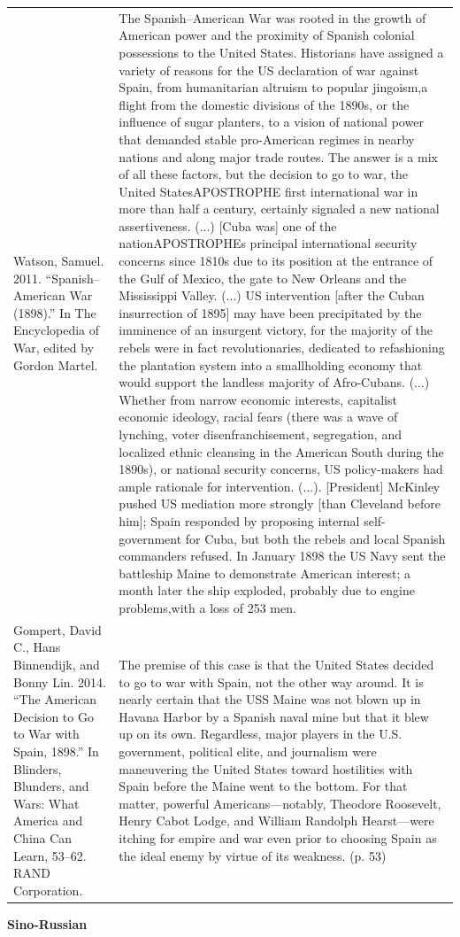 {\begin{longtable}{p{}p{}}
Watson, Samuel. 2011. “Spanish–American War (1898).” In The Encyclopedia of War, edited by Gordon Martel. & The Spanish–American War was rooted in the growth of American power and the proximity of Spanish colonial possessions to the United States. Historians have assigned a variety of reasons for the US declaration of war against Spain, from humanitarian altruism to popular jingoism,a flight from the domestic divisions of the 1890s, or the influence of sugar planters, to a vision of national power that demanded stable pro-American regimes in nearby nations and along major trade routes. The answer is a mix of all these factors, but the decision to go to war, the United StatesAPOSTROPHE first international war in more than half a century, certainly signaled a new national assertiveness. (...) [Cuba was] one of the nationAPOSTROPHEs principal international security concerns since 1810s due to its position at the entrance of the Gulf of Mexico, the gate to New Orleans and the Mississippi Valley. (...) US intervention [after the Cuban insurrection of 1895] may have been precipitated by the imminence of an insurgent victory, for the majority of the rebels were in fact revolutionaries, dedicated to refashioning the plantation system into a smallholding economy that would support the landless majority of Afro-Cubans. (...) Whether from narrow economic interests, capitalist economic ideology, racial fears (there was a wave of lynching, voter disenfranchisement, segregation, and localized ethnic cleansing in the American South during the 1890s), or national security concerns, US policy-makers had ample rationale for intervention. (...). [President] McKinley pushed US mediation more strongly [than Cleveland before him]; Spain responded by proposing internal self-government for Cuba, but both the rebels and local Spanish commanders refused. In January 1898 the US Navy sent the battleship Maine to demonstrate American interest; a month later the ship exploded, probably due to engine problems,with a loss of 253 men. 
\\
Gompert, David C., Hans Binnendijk, and Bonny Lin. 2014. “The American Decision to Go to War with Spain, 1898.” In Blinders, Blunders, and Wars: What America and China Can Learn, 53–62. RAND Corporation. & The premise of this case is that the United States decided to go to war with Spain, not the other way around. It is nearly certain that the USS Maine was not blown up in Havana Harbor by a Spanish naval mine but that it blew up on its own. Regardless, major players in the U.S. government, political elite, and journalism were maneuvering the United States toward hostilities with Spain before the Maine went to the bottom. For that matter, powerful Americans—notably, Theodore Roosevelt, Henry Cabot Lodge, and William Randolph Hearst—were itching for empire and war even prior to choosing Spain as the ideal enemy by virtue of its weakness. (p. 53)
\\
\end{longtable}}
\clearpage
         \textbf{Sino-Russian} 

